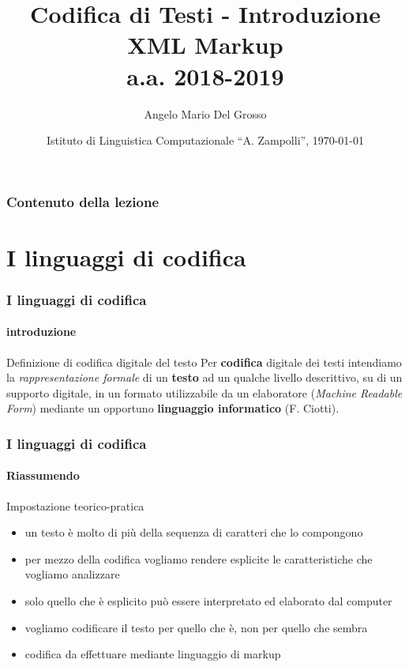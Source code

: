 \documentclass{beamer}
\title{Codifica di Testi - Introduzione XML Markup \\a.a. 2018-2019}
\author[A.M. Del Grosso]{Angelo Mario Del Grosso}
\institute{\texttt{angelo.delgrosso@ilc.cnr.it} \\\bigskip\textit{CNR-ILC-LicoLab}}
\date{Istituto di Linguistica Computazionale ``A. Zampolli'', \today}
\begin{document}
    
    \begin{frame}
        \maketitle
    \end{frame}
    
    \begin{frame}
        \frametitle{Contenuto della lezione}
        \tableofcontents
    \end{frame}
    
    \section{I linguaggi di codifica}
    \begin{frame}
        \frametitle{I linguaggi di codifica}
        \framesubtitle{introduzione}
        \addtocounter{nframe}{1}
    
        \begin{block}{Definizione di codifica digitale del testo}
            Per \textbf{codifica} digitale dei testi intendiamo la \textit{rappresentazione formale} di un \textbf{testo} ad un qualche livello descrittivo, su di un supporto digitale, in un formato utilizzabile da un elaboratore (\textit{Machine Readable Form}) mediante un opportuno \textbf{linguaggio informatico} (F. Ciotti).
        \end{block}
    
    \end{frame}
    
    \begin{frame}
        \frametitle{I linguaggi di codifica}
        \framesubtitle{Riassumendo}
        \addtocounter{nframe}{1}
    
        \begin{block}{Impostazione teorico-pratica}
           
            \begin{itemize}
                \item  un testo è molto di più della sequenza di caratteri che lo
                compongono
                \item per mezzo della codifica vogliamo rendere esplicite le
                caratteristiche che vogliamo analizzare
                \item  solo quello che è esplicito può essere interpretato ed
                elaborato dal computer
                \item vogliamo codificare il testo per quello che è, non per quello che
                sembra
                \item codifica da effettuare mediante linguaggio di markup
            \end{itemize}
            
        \end{block}
    
    \end{frame}
    
\end{document}
